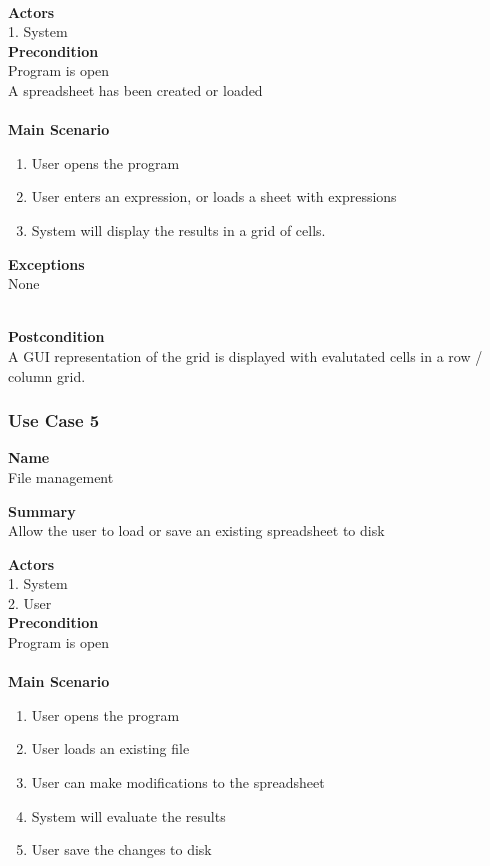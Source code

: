 \documentclass[12pt]{article}
\begin{document}
\noindent\\
{\bf Actors}\\
1. System\\

\noindent
{\bf Precondition}\\
Program is open\\
A spreadsheet has been created or loaded\\
\noindent\\
{\bf Main Scenario}\\
\vspace*{-0.2in}
\begin{enumerate}
\item User opens the program
\item User enters an expression, or loads a sheet with expressions
\item System will display the results in a grid of cells.
\end{enumerate}

\noindent
{\bf Exceptions}\\
None

\noindent\\
{\bf Postcondition}\\
A GUI representation of the grid is displayed with evalutated cells in a row / column grid.

\clearpage


\subsubsection{Use Case 5} \label{uc:5}

\noindent
{\bf Name}\\
File management

\noindent
{\bf Summary}\\
Allow the user to load or save an existing spreadsheet to disk

\noindent
{\bf Actors}\\
1. System\\
2. User \\

\noindent
{\bf Precondition}\\
Program is open\\
\noindent\\
{\bf Main Scenario}\\
\vspace*{-0.2in}
\begin{enumerate}
\item User opens the program
\item User loads an existing file
\item User can make modifications to the spreadsheet
\item System will evaluate the results
\item User save the changes to disk
\end{enumerate}
\end{document}
